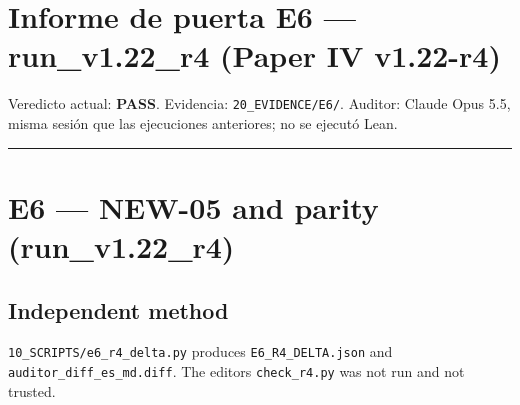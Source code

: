 \documentclass[
]{article}
\author{}
\date{}
\begin{document}
\section{Informe de puerta E6 --- run\_v1.22\_r4 (Paper IV
v1.22-r4)}\label{informe-de-puerta-e6--run_v122_r4-paper-iv-v122-r4}

Veredicto actual: \textbf{PASS}. Evidencia: \texttt{20\_EVIDENCE/E6/}.
Auditor: Claude Opus 5.5, misma sesión que las ejecuciones anteriores;
no se ejecutó Lean.

\begin{center}\rule{0.5\linewidth}{0.5pt}\end{center}

\section{E6 --- NEW-05 and parity
(run\_v1.22\_r4)}\label{e6--new-05-and-parity-run_v122_r4}

\subsection{Independent method}\label{independent-method}

\texttt{10\_SCRIPTS/e6\_r4\_delta.py} produces
\texttt{E6\_R4\_DELTA.json} and \texttt{auditor\_diff\_es\_md.diff}. The
editor\textquotesingle s \texttt{check\_r4.py} was not run and not
trusted.
\end{document}
